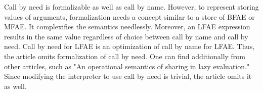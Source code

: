 Call by need is formalizable as well as call by name. However, to represent
storing values of arguments, formalization needs a concept similar to a store of
BFAE or MFAE. It complexifies the semantics needlessly. Moreover, an LFAE
expression results in the same value regardless of choice between call by name
and call by need. Call by need for LFAE is an optimization of call by name for
LFAE. Thus, the article omits formalization of call by need. One can find
additionally from other articles, such as "An operational semantics of sharing in
lazy evaluation." Since modifying the interpreter to use call by need is
trivial, the article omits it as well.
